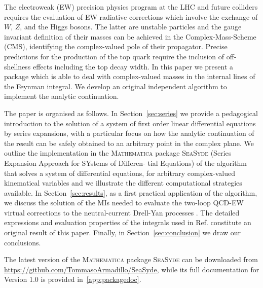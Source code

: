  
 The electroweak (EW) precision physics program at the LHC and future colliders requires the evaluation of EW radiative corrections which involve the exchange of $W$, $Z$, and the Higgs bosons. The latter are unstable particles and the gauge invariant definition of their masses can be achieved in the Complex-Mass-Scheme (CMS)\cite{Denner:2005fg}, identifying the complex-valued pole of their propagator. Precise predictions for the production of the top quark require the inclusion of off-shellness effects including the top decay width.
 In this paper we present a package which is able to deal with complex-valued masses in the internal lines of the Feynman integral. We develop an original independent algorithm to implement the analytic continuation.
 


The paper is organised as follows.
In Section~\ref{sec:series} we provide a pedagogical introduction to the solution of a system of first order linear differential equations by series expansions, with a particular focus on how the analytic continuation of the result can be safely obtained to an arbitrary point in the complex plane. 
We outline the implementation in the \textsc{Mathematica} package \textsc{SeaSyde}  (Series Expansion Approach for SYstems of Differen-
tial Equations) of the algorithm that solves a system of differential equations, for arbitrary complex-valued kinematical variables and we illustrate the different computational strategies available.
In Section~\ref{sec:results}, as a first practical application of the algorithm, we discuss the solution of the MIs needed to evaluate the two-loop QCD-EW virtual corrections to the neutral-current Drell-Yan processes \cite{Bonciani:2021zzf,Armadillo:2022bgm}.
The detailed expressions and evaluation properties of the integrals used in Ref.\cite{Armadillo:2022bgm} constitute an original result of this paper.
Finally, in Section~\ref{sec:conclusion} we draw our conclusions.

The latest version of the \textsc{Mathematica} package \textsc{SeaSyde} can be downloaded from \url{https://github.com/TommasoArmadillo/SeaSyde}, while its full documentation for Version 1.0 is provided in~\ref{app:packagedoc}.